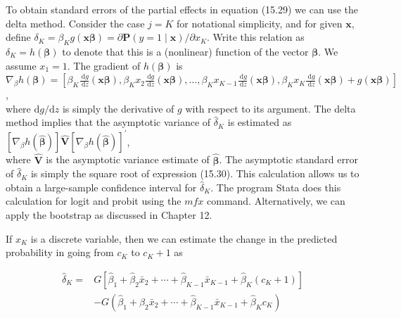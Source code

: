 \documentclass[10pt]{article}
\begin{document}
To obtain standard errors of the partial effects in equation (15.29) we can use the delta method. Consider the case $j=K$ for notational simplicity, and for given $\mathbf{x}$, define $\delta_{K}=\beta_{K} g(\mathbf{x} \boldsymbol{\beta})=\partial \mathbf{P}(y=1 \mid \mathbf{x}) / \partial x_{K}$. Write this relation as $\delta_{K}=h(\boldsymbol{\beta})$ to denote that this is a (nonlinear) function of the vector $\boldsymbol{\beta}$. We assume $x_{1}=1$. The gradient of $h(\boldsymbol{\beta})$ is\\
$\nabla_{\beta} h(\boldsymbol{\beta})=\left[\beta_{K} \frac{\mathrm{~d} g}{\mathrm{~d} z}(\mathbf{x} \boldsymbol{\beta}), \beta_{K} x_{2} \frac{\mathrm{~d} g}{\mathrm{~d} z}(\mathbf{x} \boldsymbol{\beta}), \ldots, \beta_{K} x_{K-1} \frac{\mathrm{~d} g}{\mathrm{~d} z}(\mathbf{x} \boldsymbol{\beta}), \beta_{K} x_{K} \frac{\mathrm{~d} g}{\mathrm{~d} z}(\mathbf{x} \boldsymbol{\beta})+g(\mathbf{x} \boldsymbol{\beta})\right]$,\\
where $\mathrm{d} g / \mathrm{d} z$ is simply the derivative of $g$ with respect to its argument. The delta method implies that the asymptotic variance of $\hat{\delta}_{K}$ is estimated as\\
$\left[\nabla_{\beta} h(\hat{\boldsymbol{\beta}})\right] \hat{\mathbf{V}}\left[\nabla_{\beta} h(\hat{\boldsymbol{\beta}})\right]^{\prime}$,\\
where $\hat{\mathbf{V}}$ is the asymptotic variance estimate of $\hat{\boldsymbol{\beta}}$. The asymptotic standard error of $\hat{\delta}_{K}$ is simply the square root of expression (15.30). This calculation allows us to obtain a large-sample confidence interval for $\hat{\delta}_{K}$. The program Stata does this calculation for logit and probit using the $m f x$ command. Alternatively, we can apply the bootstrap as discussed in Chapter 12.

If $x_{K}$ is a discrete variable, then we can estimate the change in the predicted probability in going from $c_{K}$ to $c_{K}+1$ as


\begin{align*}
\hat{\delta}_{K}= & G\left[\hat{\beta}_{1}+\hat{\beta}_{2} \bar{x}_{2}+\cdots+\hat{\beta}_{K-1} \bar{x}_{K-1}+\hat{\beta}_{K}\left(c_{K}+1\right)\right] \\
& -G\left(\hat{\beta}_{1}+\hat{\beta}_{2} \bar{x}_{2}+\cdots+\hat{\beta}_{K-1} \bar{x}_{K-1}+\hat{\beta}_{K} c_{K}\right) \tag{15.31}
\end{align*}
\end{document}
